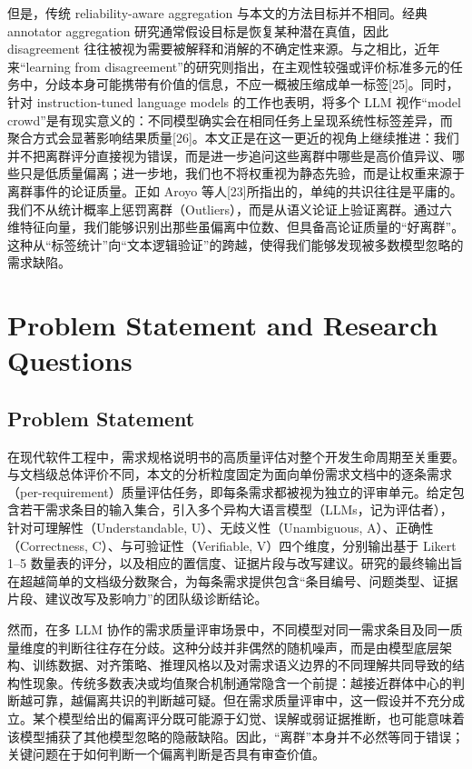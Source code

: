 \documentclass[a4paper,11pt]{ctexart}
\begin{document}
但是，传统 reliability-aware aggregation 与本文的方法目标并不相同。经典 annotator aggregation 研究通常假设目标是恢复某种潜在真值，因此 disagreement 往往被视为需要被解释和消解的不确定性来源。与之相比，近年来“learning from disagreement”的研究则指出，在主观性较强或评价标准多元的任务中，分歧本身可能携带有价值的信息，不应一概被压缩成单一标签[25]。同时，针对 instruction-tuned language models 的工作也表明，将多个 LLM 视作“model crowd”是有现实意义的：不同模型确实会在相同任务上呈现系统性标签差异，而聚合方式会显著影响结果质量[26]。本文正是在这一更近的视角上继续推进：我们并不把离群评分直接视为错误，而是进一步追问这些离群中哪些是高价值异议、哪些只是低质量偏离；进一步地，我们也不将权重视为静态先验，而是让权重来源于离群事件的论证质量。正如 Aroyo 等人[23]所指出的，单纯的共识往往是平庸的。我们不从统计概率上惩罚离群（Outliers），而是从语义论证上验证离群。通过六维特征向量，我们能够识别出那些虽偏离中位数、但具备高论证质量的“好离群”。这种从“标签统计”向“文本逻辑验证”的跨越，使得我们能够发现被多数模型忽略的需求缺陷。

\section{Problem Statement and Research Questions}
\label{sec:problem}

\subsection{Problem Statement}
在现代软件工程中，需求规格说明书的高质量评估对整个开发生命周期至关重要。与文档级总体评价不同，本文的分析粒度固定为面向单份需求文档中的逐条需求（per-requirement）质量评估任务，即每条需求都被视为独立的评审单元。给定包含若干需求条目的输入集合，引入多个异构大语言模型（LLMs，记为评估者），针对可理解性（Understandable, U）、无歧义性（Unambiguous, A）、正确性（Correctness, C）、与可验证性（Verifiable, V）四个维度，分别输出基于 Likert 1--5 数量表的评分，以及相应的置信度、证据片段与改写建议。研究的最终输出旨在超越简单的文档级分数聚合，为每条需求提供包含“条目编号、问题类型、证据片段、建议改写及影响力”的团队级诊断结论。

然而，在多 LLM 协作的需求质量评审场景中，不同模型对同一需求条目及同一质量维度的判断往往存在分歧。这种分歧并非偶然的随机噪声，而是由模型底层架构、训练数据、对齐策略、推理风格以及对需求语义边界的不同理解共同导致的结构性现象。传统多数表决或均值聚合机制通常隐含一个前提：越接近群体中心的判断越可靠，越偏离共识的判断越可疑。但在需求质量评审中，这一假设并不充分成立。某个模型给出的偏离评分既可能源于幻觉、误解或弱证据推断，也可能意味着该模型捕获了其他模型忽略的隐蔽缺陷。因此，“离群”本身并不必然等同于错误；关键问题在于如何判断一个偏离判断是否具有审查价值。
\end{document}
